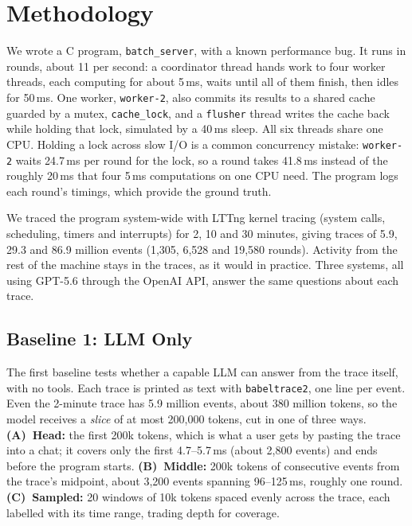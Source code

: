 \section{Methodology}

We wrote a C program, \texttt{batch\_server}, with a known performance
bug. It runs in rounds, about 11 per second: a coordinator thread hands
work to four worker threads, each computing for about 5\,ms, waits until
all of them finish, then idles for 50\,ms. One worker, \texttt{worker-2},
also commits its results to a shared cache guarded by a mutex,
\texttt{cache\_lock}, and a \texttt{flusher} thread writes the cache back
while holding that lock, simulated by a 40\,ms sleep. All six threads
share one CPU. Holding a lock across slow I/O is a common concurrency
mistake: \texttt{worker-2} waits 24.7\,ms per round for the lock, so a
round takes 41.8\,ms instead of the roughly 20\,ms that four 5\,ms
computations on one CPU need. The program logs each round's timings,
which provide the ground truth.

We traced the program system-wide with LTTng kernel tracing (system calls,
scheduling, timers and interrupts) for 2, 10 and 30 minutes, giving traces
of 5.9, 29.3 and 86.9 million events (1{,}305, 6{,}528 and 19{,}580
rounds). Activity from the rest of the machine stays in the traces, as it
would in practice. Three systems, all using GPT-5.6 through the OpenAI
API, answer the same questions about each trace.

\subsection{Baseline 1: LLM Only}

The first baseline tests whether a capable LLM can answer from the trace
itself, with no tools. Each trace is printed as text with
\texttt{babeltrace2}, one line per event. Even the 2-minute trace has
5.9 million events, about 380 million tokens, so the model receives a
\emph{slice} of at most 200{,}000 tokens, cut in one of three ways.
\textbf{(A)~Head:} the first 200k tokens, which is what a user gets by
pasting the trace into a chat; it covers only the first 4.7--5.7\,ms
(about 2{,}800 events) and ends before the program starts.
\textbf{(B)~Middle:} 200k tokens of consecutive events from the trace's
midpoint, about 3{,}200 events spanning 96--125\,ms, roughly one round.
\textbf{(C)~Sampled:} 20 windows of 10k tokens spaced evenly across the
trace, each labelled with its time range, trading depth for coverage.

